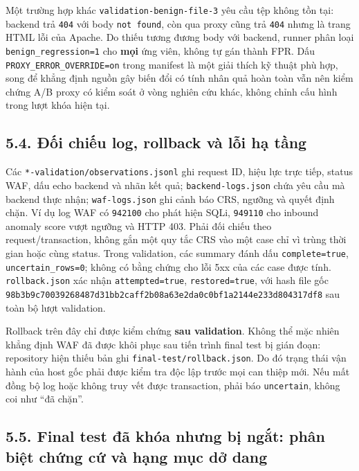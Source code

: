 \documentclass[
  10pt,
  a4paper,
]{article}
\begin{document}
Một trường hợp khác \texttt{validation-benign-file-3} yêu cầu tệp không
tồn tại: backend trả \texttt{404} với body \texttt{not\ found}, còn qua
proxy cũng trả \texttt{404} nhưng là trang HTML lỗi của Apache. Do thiếu
tương đương body với backend, runner phân loại
\texttt{benign\_regression=1} cho \textbf{mọi} ứng viên, không tự gán
thành FPR. Dấu \texttt{PROXY\_ERROR\_OVERRIDE=on} trong manifest là một
giải thích kỹ thuật phù hợp, song để khẳng định nguồn gây biến đổi có
tính nhân quả hoàn toàn vẫn nên kiểm chứng A/B proxy có kiểm soát ở vòng
nghiên cứu khác, không chỉnh cấu hình trong lượt khóa hiện tại.

\subsection{5.4. Đối chiếu log, rollback và lỗi hạ
tầng}\label{ux111ux1ed1i-chiux1ebfu-log-rollback-vuxe0-lux1ed7i-hux1ea1-tux1ea7ng}

Các \texttt{*-validation/observations.jsonl} ghi request ID, hiệu lực
trực tiếp, status WAF, dấu echo backend và nhãn kết quả;
\texttt{backend-logs.json} chứa yêu cầu mà backend thực nhận;
\texttt{waf-logs.json} ghi cảnh báo CRS, ngưỡng và quyết định chặn. Ví
dụ log WAF có \texttt{942100} cho phát hiện SQLi, \texttt{949110} cho
inbound anomaly score vượt ngưỡng và HTTP 403. Phải đối chiếu theo
request/transaction, không gắn một quy tắc CRS vào một case chỉ vì trùng
thời gian hoặc cùng status. Trong validation, các summary đánh dấu
\texttt{complete=true}, \texttt{uncertain\_rows=0}; không có bằng chứng
cho lỗi 5xx của các case được tính. \texttt{rollback.json} xác nhận
\texttt{attempted=true}, \texttt{restored=true}, với hash file gốc
\texttt{98b3b9c700392684\allowbreak{}87d31bb2caff2b08\allowbreak{}a63e2da0c0bf1a21\allowbreak{}44e233d804317df8}
sau toàn bộ lượt validation.

Rollback trên đây chỉ được kiểm chứng \textbf{sau validation}. Không thể
mặc nhiên khẳng định WAF đã được khôi phục sau tiến trình final test bị
gián đoạn: repository hiện thiếu bản ghi
\texttt{final-test/rollback.json}. Do đó trạng thái vận hành của host
gốc phải được kiểm tra độc lập trước mọi can thiệp mới. Nếu mất đồng bộ
log hoặc không truy vết được transaction, phải báo \texttt{uncertain},
không coi như ``đã chặn''.

\subsection{5.5. Final test đã khóa nhưng bị ngắt: phân biệt chứng cứ và
hạng mục dở
dang}\label{final-test-ux111uxe3-khuxf3a-nhux1b0ng-bux1ecb-ngux1eaft-phuxe2n-biux1ec7t-chux1ee9ng-cux1ee9-vuxe0-hux1ea1ng-mux1ee5c-dux1edf-dang}
\end{document}

